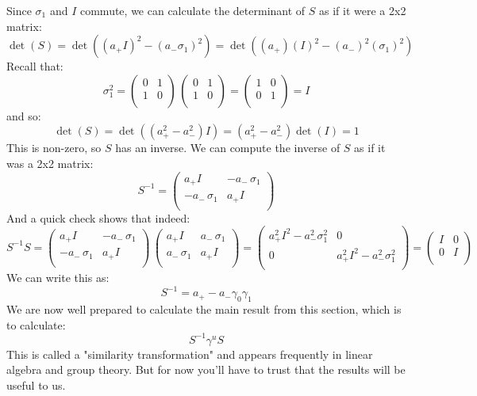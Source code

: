 \documentclass[12pt]{book}
\begin{document}
Since $\sigma_1$ and $I$ commute, we can calculate the determinant of $S$ as if it were a 2x2 matrix:
$$\det(S) = \det((a_+ I)^2 - (a_-\sigma_1)^2) = \det((a_+) (I)^2 - (a_-)^2(\sigma_1)^2)$$
Recall that:
$$\sigma_1^2 = 
\begin{pmatrix} 
0 & 1 \\ 
1 & 0 \\
\end{pmatrix}
\,
\begin{pmatrix} 
0 & 1 \\ 
1 & 0 \\
\end{pmatrix}
=
\begin{pmatrix} 
1 & 0 \\ 
0 & 1 \\
\end{pmatrix}
=
I
$$
and so:
$$\det(S) = \det((a_+^2 - a_-^2) I) = (a_+^2 - a_-^2) \det(I) = 1 $$
This is non-zero, so $S$ has an inverse.  We can compute the inverse of $S$ as if it was a 2x2 matrix:
$$S^{-1} = \begin{pmatrix} 
a_+ I & -a_- \, \sigma_1 \\ 
-a_- \, \sigma_1 & a_+ I \\
\end{pmatrix}
$$
And a quick check shows that indeed:
$$S^{-1}S = 
\begin{pmatrix} 
a_+ I & -a_- \, \sigma_1 \\ 
-a_- \, \sigma_1 & a_+ I \\
\end{pmatrix}
\,
\begin{pmatrix} 
a_+ I & a_- \, \sigma_1 \\ 
a_- \, \sigma_1 & a_+ I \\
\end{pmatrix}
= 
\begin{pmatrix} 
a_+^2I^2-a_-^2\sigma_1^2 & 0 \\ 
0 & a_+^2I^2-a_-^2\sigma_1^2 \\ 
\end{pmatrix}
=
\begin{pmatrix} 
I & 0 \\ 
0 & I \\ 
\end{pmatrix}
$$
We can write this as:
$$S^{-1} = a_+ - a_- \gamma_0 \gamma_1$$
We are now well prepared to calculate the main result from this section, which is to calculate:
$$S^{-1} \gamma^u S$$
This is called a "similarity transformation" and appears frequently in linear algebra and group theory.  But for now you'll have to trust that the results will be useful to us.
\end{document}
